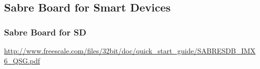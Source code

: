 \subsection{Sabre Board for Smart Devices}

\begin{frame}
  \frametitle{Sabre Board for SD}
  \url{http://www.freescale.com/files/32bit/doc/quick_start_guide/SABRESDB_IMX6_QSG.pdf}
\end{frame}
